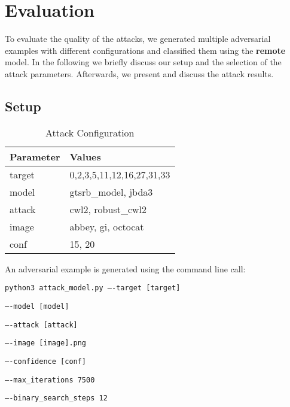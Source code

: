 
\section{Evaluation}

To evaluate the quality of the attacks, we generated multiple adversarial examples with different configurations and classified them using the \textbf{remote} model. In the following we briefly discuss our setup and the selection of the attack parameters. Afterwards, we present and discuss the attack results.

\subsection{Setup}

\begin{table}
\begin{tabular}{l | l}
\textbf{Parameter} & \textbf{Values} \\\hline

target & 0,2,3,5,11,12,16,27,31,33 \\\hline

model & gtsrb\_model, jbda3\\\hline

attack & cwl2, robust\_cwl2\\\hline

image & abbey, gi, octocat\\\hline

conf & 15, 20
\end{tabular}
\caption{Attack Configuration}
\label{tab:cli_params}
\end{table}

\begin{minipage}{\linewidth}
An adversarial example is generated using the command line call:

\vspace{2ex}
\texttt{python3 attack\_model.py ----target [target]}

\hspace{4cm}\texttt{----model [model]}

\hspace{4cm}\texttt{----attack [attack]}

\hspace{4cm}\texttt{----image [image].png}

\hspace{4cm}\texttt{----confidence [conf]}

\hspace{4cm}\texttt{----max\_iterations 7500}

\hspace{4cm}\texttt{----binary\_search\_steps 12}
\vspace{2ex}
\end{minipage}

